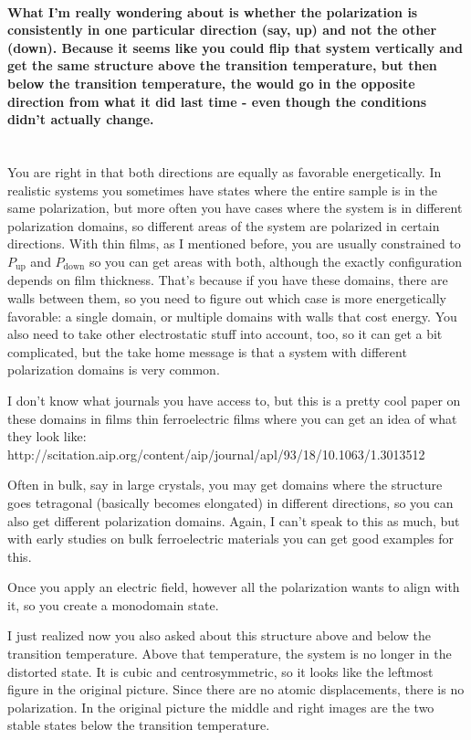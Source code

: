 \begin{changemargin}{2.5cm}{2.5cm}
\paragraph{What I'm really wondering about is whether the polarization is consistently in one particular direction (say, up) and not the other (down). Because it seems like you could flip that system vertically and get the same structure above the transition temperature, but then below the transition temperature, the  would go in the opposite direction from what it did last time - even though the conditions didn't actually change.} \mbox{}\\

\noindent You are right in that both directions are equally as favorable energetically. In realistic systems you sometimes have states where the entire sample is in the same polarization, but more often you have cases where the system is in different polarization domains, so different areas of the system are polarized in certain directions. With thin films, as I mentioned before, you are usually constrained to $P_{\text{up}}$ and $P_{\text{down}}$ so you can get areas with both, although the exactly configuration depends on film thickness. That's because if you have these domains, there are walls between them, so you need to figure out which case is more energetically favorable: a single domain, or multiple domains with walls that cost energy. You also need to take other electrostatic stuff into account, too, so it can get a bit complicated, but the take home message is that a system with different polarization domains is very common.

I don't know what journals you have access to, but this is a pretty cool paper on these domains in films thin ferroelectric films where you can get an idea of what they look like: {\ttfamily http://scitation.aip.org/content/aip/journal/apl/93/18/10.1063/1.3013512}

Often in bulk, say in large crystals, you may get domains where the structure goes tetragonal (basically becomes elongated) in different directions, so you can also get different polarization domains. Again, I can't speak to this as much, but with early studies on bulk ferroelectric materials you can get good examples for this.

Once you apply an electric field, however all the polarization wants to align with it, so you create a monodomain state.

I just realized now you also asked about this structure above and below the transition temperature. Above that temperature, the system is no longer in the distorted state. It is cubic and centrosymmetric, so it looks like the leftmost figure in the original picture. Since there are no atomic displacements, there is no polarization. In the original picture the middle and right images are the two stable states below the transition temperature.


\end{changemargin}
